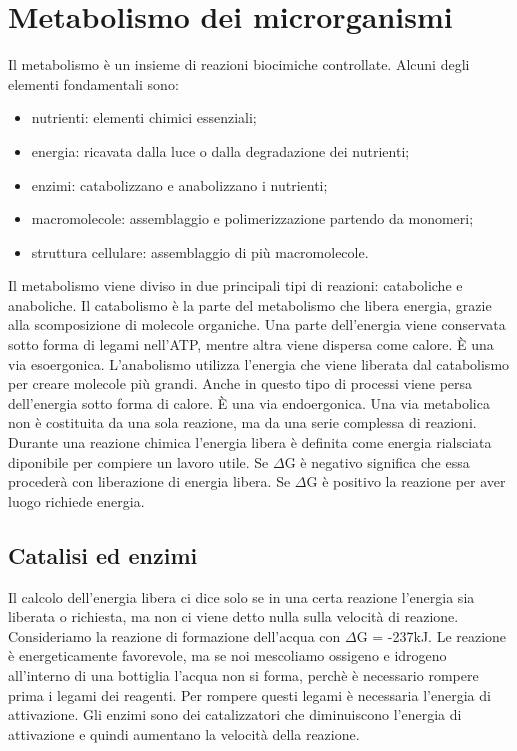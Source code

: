 \chapter{Metabolismo dei microrganismi}
Il metabolismo \`e un insieme di reazioni biocimiche controllate. Alcuni degli elementi fondamentali sono:
\begin{itemize}
    \item nutrienti: elementi chimici essenziali; 
    \item energia: ricavata dalla luce o dalla degradazione dei nutrienti;
    \item enzimi: catabolizzano e anabolizzano i nutrienti;
    \item macromolecole: assemblaggio e polimerizzazione partendo da monomeri; 
    \item struttura cellulare: assemblaggio di pi\`u macromolecole. 
\end{itemize}
Il metabolismo viene diviso in due principali tipi di reazioni: cataboliche e anaboliche. 
Il catabolismo \`e la parte del metabolismo che libera energia, grazie alla scomposizione di molecole organiche. Una parte dell'energia viene conservata sotto forma di legami nell'ATP, mentre altra viene dispersa come calore. \`E una via esoergonica.
L'anabolismo utilizza l'energia che viene liberata dal catabolismo per creare molecole pi\`u grandi. Anche in questo tipo di processi viene persa dell'energia sotto forma di calore. \`E una via endoergonica.
Una via metabolica non \`e costituita da una sola reazione, ma da una serie complessa di reazioni. Durante una reazione chimica l'energia libera \`e definita come energia rialsciata diponibile per compiere un lavoro utile. 
Se ${\Delta}$G \`e negativo significa che essa proceder\`a con liberazione di energia libera.
Se ${\Delta}$G \`e positivo la reazione per aver luogo richiede energia.
\section{Catalisi ed enzimi}
Il calcolo dell'energia libera ci dice solo se in una certa reazione l'energia sia liberata o richiesta, ma non ci viene detto nulla sulla velocit\`a di reazione.
Consideriamo la reazione di formazione dell'acqua con ${\Delta}$G = -237kJ. Le reazione \`e energeticamente favorevole, ma se noi mescoliamo ossigeno e idrogeno all'interno di una bottiglia l'acqua non si forma, perch\`e \`e necessario rompere prima i legami dei reagenti. Per rompere questi legami \`e necessaria l'energia di attivazione. Gli enzimi sono dei catalizzatori che diminuiscono l'energia di attivazione e quindi aumentano la velocit\`a della reazione.
